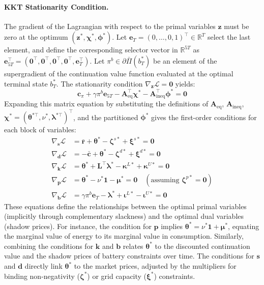 \documentclass[12pt, notitlepage]{article}
\begin{document}
\paragraph{KKT Stationarity Condition.}
The gradient of the Lagrangian with respect to the primal variables $\mathbf{z}$ must be zero at the optimum $(\mathbf{z}^*, \boldsymbol{\chi}^*, \boldsymbol{\phi}^*)$. Let $\mathbf{e}_T = (0, \dots, 0, 1)^\top \in \mathbb{R}^T$ select the last element, and define the corresponding selector vector in $\mathbb{R}^{5T}$ as $\mathbf{e}_{5T}^\top = (\mathbf{0}^\top, \mathbf{0}^\top, \mathbf{0}^\top, \mathbf{0}^\top, \mathbf{e}_T^\top)$. Let $\pi^b \in \partial \bar{\Pi}(b_T^*)$ be an element of the supergradient of the continuation value function evaluated at the optimal terminal state $b_T^*$. The stationarity condition $\nabla_{\mathbf{z}} \mathcal{L} = \mathbf{0}$ yields:
\[
\mathbf{c}_{\pi} + \gamma \pi^b \mathbf{e}_{5T} - \mathbf{A}_{\text{eq}}^\top \boldsymbol{\chi}^* - \mathbf{A}_{\text{ineq}}^\top \boldsymbol{\phi}^* = \mathbf{0}
\]
Expanding this matrix equation by substituting the definitions of $\mathbf{A}_{\text{eq}}$, $\mathbf{A}_{\text{ineq}}$, $\boldsymbol{\chi}^* = (\boldsymbol{\theta}^{*\top}, \nu^*, \boldsymbol{\lambda}^{*\top})^\top$, and the partitioned $\boldsymbol{\phi}^*$ gives the first-order conditions for each block of variables:
\begin{align*}
\nabla_{\mathbf{s}} \mathcal{L} &= \bar{\mathbf{r}} + \boldsymbol{\theta}^* - \boldsymbol{\zeta}^{s*} + \boldsymbol{\xi}^{s*} = \mathbf{0} \\
\nabla_{\mathbf{d}} \mathcal{L} &= -\bar{\mathbf{c}} + \boldsymbol{\theta}^* - \boldsymbol{\zeta}^{d*} + \boldsymbol{\xi}^{d*} = \mathbf{0} \\
\nabla_{\mathbf{k}} \mathcal{L} &= \boldsymbol{\theta}^* +  \mathbf{L}^\top \boldsymbol{\lambda}^* - \boldsymbol{\kappa}^{L*} + \boldsymbol{\kappa}^{U*} = \mathbf{0} \\
\nabla_{\mathbf{p}} \mathcal{L} &= \boldsymbol{\theta}^* - \nu^* \mathbf{1} - \boldsymbol{\mu}^* = \mathbf{0} \quad (\text{assuming } \boldsymbol{\zeta}^{p*} = \mathbf{0}) \\
\nabla_{\mathbf{b}} \mathcal{L} &= \gamma \pi^b \mathbf{e}_T - \boldsymbol{\lambda}^* + \boldsymbol{\iota}^{L*} - \boldsymbol{\iota}^{U*} = \mathbf{0}
\end{align*}
These equations define the relationships between the optimal primal variables (implicitly through complementary slackness) and the optimal dual variables (shadow prices). For instance, the condition for $\mathbf{p}$ implies $\boldsymbol{\theta}^* = \nu^*  \mathbf{1} + \boldsymbol{\mu}^*$, equating the marginal value of energy to its marginal value in consumption. Similarly, combining the conditions for $\mathbf{k}$ and $\mathbf{b}$ relates $\boldsymbol{\theta}^*$ to the discounted continuation value and the shadow prices of battery constraints over time. The conditions for $\mathbf{s}$ and $\mathbf{d}$ directly link $\boldsymbol{\theta}^*$ to the market prices, adjusted by the multipliers for binding non-negativity ($\boldsymbol{\zeta}^*$) or grid capacity ($\boldsymbol{\xi}^*$) constraints.
\end{document}
